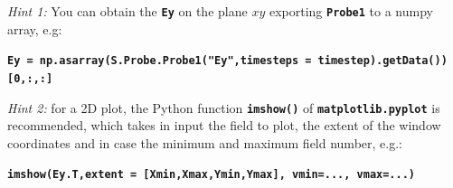 \documentclass{article}
\newcommand{\commandline}[1]{\texttt{\textbf{#1}}}
\begin{document}
\textit{Hint 1:} You can obtain the \commandline{Ey} on the plane $xy$ exporting \commandline{Probe1} to a numpy array, e.g:

\commandline{Ey = np.asarray(S.Probe.Probe1("Ey",timesteps = timestep).getData())[0,:,:]}

\textit{Hint 2:} for a 2D plot, the Python function \commandline{imshow()} of \commandline{matplotlib.pyplot} is recommended, which takes in input the field to plot, the extent of the window coordinates and in case the minimum and maximum field number, e.g.:

\commandline{imshow(Ey.T,extent = [Xmin,Xmax,Ymin,Ymax], vmin=..., vmax=...)}








 
\end{document}

